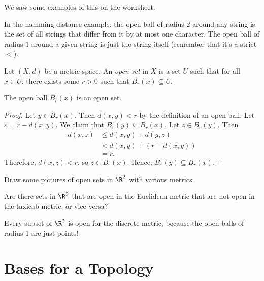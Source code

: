 \documentclass[noname]{notes}
\begin{document}
We saw some examples of this on the worksheet. 

\begin{example}
	In the hamming distance example, the open ball of radius $2$ around any string is the set of all strings that differ from it by at most one character. The open ball of radius $1$ around a given string is just the string itself (remember that it's a strict $<$). 
\end{example}

\begin{definition}
	Let $(X,d)$ be a metric space. An \emph{open set} in $X$ is a set $U$ such that for all $x \in U$, there exists some $r > 0$ such that $B_r(x) \subseteq U$. 
\end{definition}

\begin{lemma}
\label{open balls are open}
	The open ball $B_r(x)$ is an open set. 
\end{lemma}

\begin{proof}
	Let $y \in B_r(x)$. Then $d(x,y) < r$ by the definition of an open ball. Let $\varepsilon = r - d(x,y)$. We claim that $B_\varepsilon(y) \subseteq B_r(x)$. Let $z \in B_\varepsilon(y)$. Then 
	\begin{align*}
		d(x,z) &\leq d(x,y) + d(y,z) \\
			&< d(x,y) + (r - d(x,y)) \\
			&= r.
	\end{align*}
	Therefore, $d(x,z) < r$, so $z \in B_r(x)$. Hence, $B_\varepsilon(y) \subseteq B_r(x)$. 
\end{proof}

\begin{example}
	Draw some pictures of open sets in $\R^2$ with various metrics. 
\end{example}

\begin{question}
	Are there sets in $\R^2$ that are open in the Euclidean metric that are not open in the taxicab metric, or vice versa? 
\end{question}

\begin{example}
	Every subset of $\R^2$ is open for the discrete metric, because the open balls of radius $1$ are just points! 
\end{example}

\section{Bases for a Topology} 
\end{document}
